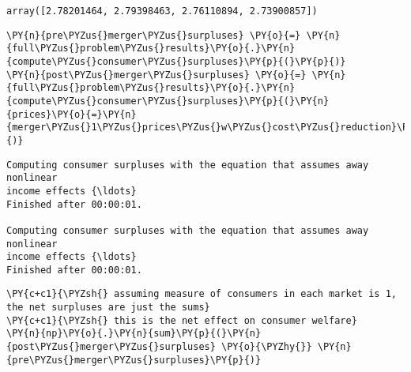             \begin{tcolorbox}[breakable, size=fbox, boxrule=.5pt, pad at break*=1mm, opacityfill=0]
\begin{Verbatim}[commandchars=\\\{\}]
array([2.78201464, 2.79398463, 2.76110894, 2.73900857])
\end{Verbatim}
\end{tcolorbox}

    \begin{tcolorbox}[breakable, size=fbox, boxrule=1pt, pad at break*=1mm,colback=cellbackground, colframe=cellborder]
\begin{Verbatim}[commandchars=\\\{\}]
\PY{n}{pre\PYZus{}merger\PYZus{}surpluses} \PY{o}{=} \PY{n}{full\PYZus{}problem\PYZus{}results}\PY{o}{.}\PY{n}{compute\PYZus{}consumer\PYZus{}surpluses}\PY{p}{(}\PY{p}{)}
\PY{n}{post\PYZus{}merger\PYZus{}surpluses} \PY{o}{=} \PY{n}{full\PYZus{}problem\PYZus{}results}\PY{o}{.}\PY{n}{compute\PYZus{}consumer\PYZus{}surpluses}\PY{p}{(}\PY{n}{prices}\PY{o}{=}\PY{n}{merger\PYZus{}1\PYZus{}prices\PYZus{}w\PYZus{}cost\PYZus{}reduction}\PY{p}{)}
\end{Verbatim}
\end{tcolorbox}

    \begin{Verbatim}[commandchars=\\\{\}]
Computing consumer surpluses with the equation that assumes away nonlinear
income effects {\ldots}
Finished after 00:00:01.

Computing consumer surpluses with the equation that assumes away nonlinear
income effects {\ldots}
Finished after 00:00:01.

    \end{Verbatim}

    \begin{tcolorbox}[breakable, size=fbox, boxrule=1pt, pad at break*=1mm,colback=cellbackground, colframe=cellborder]
\begin{Verbatim}[commandchars=\\\{\}]
\PY{c+c1}{\PYZsh{} assuming measure of consumers in each market is 1, the net surpluses are just the sums}
\PY{c+c1}{\PYZsh{} this is the net effect on consumer welfare}
\PY{n}{np}\PY{o}{.}\PY{n}{sum}\PY{p}{(}\PY{n}{post\PYZus{}merger\PYZus{}surpluses} \PY{o}{\PYZhy{}} \PY{n}{pre\PYZus{}merger\PYZus{}surpluses}\PY{p}{)}
\end{Verbatim}
\end{tcolorbox}

